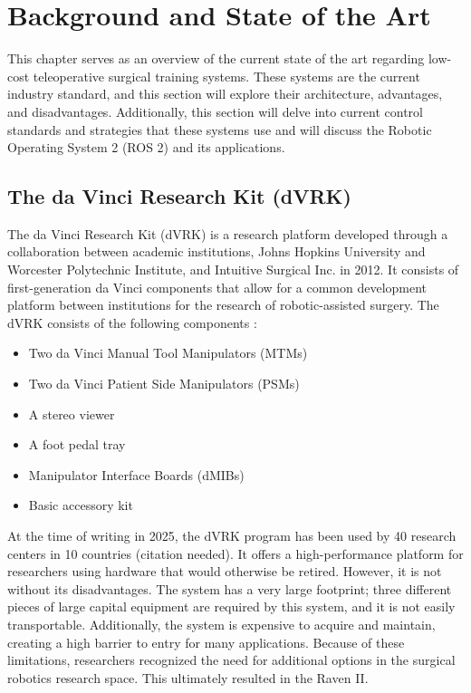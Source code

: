 \chapter{Background and State of the Art}
This chapter serves as an overview of the current state of the art regarding low-cost teleoperative surgical training systems. These systems are the current industry standard, and this section will explore their architecture, advantages, and disadvantages. Additionally, this section will delve into current control standards and strategies that these systems use and will discuss the Robotic Operating System 2 (ROS 2) and its applications.

\section{The da Vinci Research Kit (dVRK)}  
The da Vinci Research Kit (dVRK) is a research platform developed through a collaboration between academic institutions, Johns Hopkins University and Worcester Polytechnic Institute, and Intuitive Surgical Inc. in 2012. It consists of first-generation da Vinci components that allow for a common development platform between institutions for the research of robotic-assisted surgery. The dVRK consists of the following components \cite{dVRK}:  

\begin{itemize}  
    \item Two da Vinci Manual Tool Manipulators (MTMs)  
    \item Two da Vinci Patient Side Manipulators (PSMs)  
    \item A stereo viewer  
    \item A foot pedal tray  
    \item Manipulator Interface Boards (dMIBs)  
    \item Basic accessory kit  
\end{itemize}  

At the time of writing in 2025, the dVRK program has been used by 40 research centers in 10 countries (citation needed). It offers a high-performance platform for researchers using hardware that would otherwise be retired. However, it is not without its disadvantages. The system has a very large footprint; three different pieces of large capital equipment are required by this system, and it is not easily transportable. Additionally, the system is expensive to acquire and maintain, creating a high barrier to entry for many applications. Because of these limitations, researchers recognized the need for additional options in the surgical robotics research space. This ultimately resulted in the Raven II.

